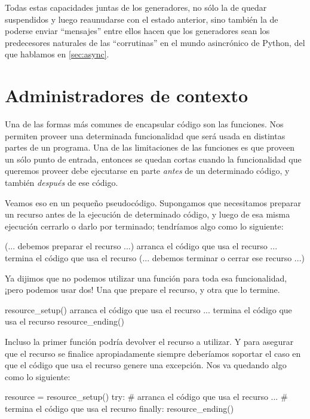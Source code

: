 Todas estas capacidades juntas de los generadores, no sólo la de quedar suspendidos y luego reaunudarse con el estado anterior, sino también la de poderse enviar ``mensajes'' entre ellos hacen que los generadores sean los predecesores naturales de las ``corrutinas'' en el mundo asincrónico de Python, del que hablamos en \ref{sec:async}.


\section{Administradores de contexto}\label{sec:contextmanagers}

Una de las formas más comunes de encapsular código son las funciones. Nos permiten proveer una determinada funcionalidad que será usada en distintas partes de un programa. Una de las limitaciones de las funciones es que proveen un sólo punto de entrada, entonces se quedan cortas cuando la funcionalidad que queremos proveer debe ejecutarse en parte \textit{antes} de un determinado código, y también \textit{después} de ese código.

Veamos eso en un pequeño pseudocódigo. Supongamos que necesitamos preparar un recurso antes de la ejecución de determinado código, y luego de esa misma ejecución cerrarlo o darlo por terminado; tendríamos algo como lo siguiente:

\begin{py}
(... debemos preparar el recurso ...)
arranca el código que usa el recurso
...
termina el código que usa el recurso
(... debemos terminar o cerrar ese recurso ...)
\end{py}

Ya dijimos que no podemos utilizar una función para toda esa funcionalidad, ¡pero podemos usar dos! Una que prepare el recurso, y otra que lo termine.

\begin{py}
resource_setup()
arranca el código que usa el recurso
...
termina el código que usa el recurso
resource_ending()
\end{py}

Incluso la primer función podría devolver el recurso a utilizar. Y para asegurar que el recurso se finalice apropiadamente siempre deberíamos soportar el caso en que el código que usa el recurso genere una excepción. Nos va quedando algo como lo siguiente:

\begin{py}
resource = resource_setup()
try:
    # arranca el código que usa el recurso
    ...
    # termina el código que usa el recurso
finally:
    resource_ending()
\end{py}

